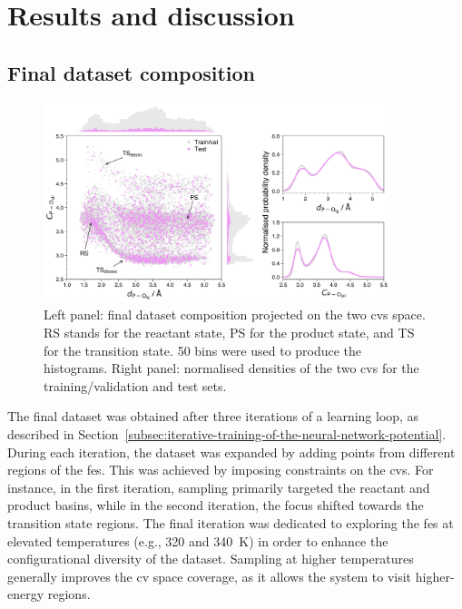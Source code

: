 \chapter{Results and discussion}

\section{Final dataset composition}

\begin{figure}[ht]
    \centering
    \includegraphics[width=0.9\textwidth]{Figures/4_Results/results_final_dataset_with_histograms.png}
    \caption{Left panel: final dataset composition projected on the two \acp{cv} space. RS stands for the reactant state, PS for the product state, and TS for the transition state. 50 bins were used to produce the histograms. Right panel: normalised densities of the two \acp{cv} for the training/validation and test sets.}
    \label{fig:final_dataset}
\end{figure}

The final dataset was obtained after three iterations of a learning loop, as described in Section~\ref{subsec:iterative-training-of-the-neural-network-potential}. During each iteration, the dataset was expanded by adding points from different regions of the \ac{fes}. This was achieved by imposing constraints on the \acp{cv}. For instance, in the first iteration, sampling primarily targeted the reactant and product basins, while in the second iteration, the focus shifted towards the transition state regions. The final iteration was dedicated to exploring the \ac{fes} at elevated temperatures (e.g., 320 and 340~K) in order to enhance the configurational diversity of the dataset. Sampling at higher temperatures generally improves the \ac{cv} space coverage, as it allows the system to visit higher-energy regions.

